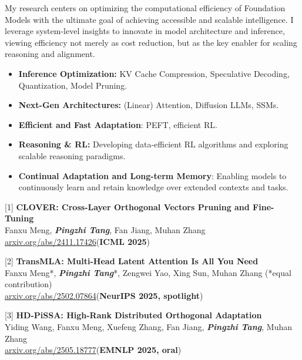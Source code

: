 \documentclass[11pt,a4paper]{article}
\renewcommand{\section}[1]{%
  \vspace{0.9em}%
  \noindent{\large\bfseries\sectionfont\color{headerblue}#1}%
  \vspace{-0.5em}%
  \par\noindent{\color{headerblue}\rule{\textwidth}{0.8pt}}%
  \vspace{0.3em}%
  \par
}
\newcommand{\myname}{\textbf{\textit{Pingzhi Tang}}}
\begin{document}
\noindent
My research centers on optimizing the computational efficiency of Foundation Models with the ultimate goal of achieving accessible and scalable intelligence. I leverage system-level insights to innovate in model architecture and inference, viewing efficiency not merely as cost reduction, but as the key enabler for scaling reasoning and alignment.
\begin{itemize}
  \item \textbf{Inference Optimization:} KV Cache Compression, Speculative Decoding, Quantization, Model Pruning.
  \item \textbf{Next-Gen Architectures:} (Linear) Attention, Diffusion LLMs, SSMs.
  \item \textbf{Efficient and Fast Adaptation}: PEFT, efficient RL.
  \item \textbf{Reasoning \& RL:} Developing data-efficient RL algorithms and exploring scalable reasoning paradigms.
  \item \textbf{Continual Adaptation and Long-term Memory}: Enabling models to continuously learn and retain knowledge over extended contexts and tasks.
\end{itemize}

\section{Publications}

\noindent
{[1]} \textbf{CLOVER: Cross-Layer Orthogonal Vectors Pruning and Fine-Tuning}\\
Fanxu Meng, \myname, Fan Jiang, Muhan Zhang\\
\href{https://arxiv.org/abs/2411.17426}{arxiv.org/abs/2411.17426}\quad (\textbf{ICML 2025})

\medskip\noindent
{[2]} \textbf{TransMLA: Multi-Head Latent Attention Is All You Need}\\
Fanxu Meng*, \myname*, Zengwei Yao, Xing Sun, Muhan Zhang (*equal contribution)\\
\href{https://arxiv.org/abs/2502.07864}{arxiv.org/abs/2502.07864}\quad (\textbf{NeurIPS 2025, spotlight})

\medskip\noindent
{[3]} \textbf{HD-PiSSA: High-Rank Distributed Orthogonal Adaptation}\\
Yiding Wang, Fanxu Meng, Xuefeng Zhang, Fan Jiang, \myname, Muhan Zhang\\
\href{https://arxiv.org/abs/2505.18777}{arxiv.org/abs/2505.18777}\quad (\textbf{EMNLP 2025, oral})
\end{document}
